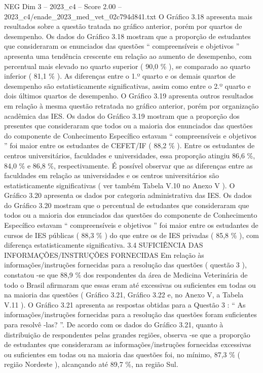 \begin{textsample}{NEG Dim 3 – 2023\_c4 – Score 2.00 – 2023\_c4/enade\_2023\_med\_vet\_02c794d841.txt}
O Gráfico 3.18 apresenta mais resultados sobre a questão tratada no gráfico anterior, porém por quartos de desempenho.
Os dados do Gráfico 3.18 mostram que a proporção de estudantes que consideraram os enunciados das questões “ compreensíveis e objetivos ” apresenta uma tendência crescente em relação ao aumento de desempenho, com percentual mais elevado no quarto superior ( 90,0 \% ), se comparado ao quarto inferior ( 81,1 \% ).
As diferenças entre o 1.º quarto e os demais quartos de desempenho são estatisticamente significativas, assim como entre o 2.º quarto e dois últimos quartos de desempenho.
O Gráfico 3.19 apresenta outros resultados em relação à mesma questão retratada no gráfico anterior, porém por organização acadêmica das IES.
Os dados do Gráfico 3.19 mostram que a proporção dos presentes que consideraram que todos ou a maioria dos enunciados das questões do componente de Conhecimento Específico estavam “ compreensíveis e objetivos ” foi maior entre os estudantes de CEFET/IF ( 88,2 \% ).
Entre os estudantes de centros universitários, faculdades e universidades, essa proporção atingiu 86,6 \%, 84,0 \% e 86,8 \%, respectivamente.
É possível observar que as diferenças entre as faculdades em relação as universidades e os centros universitários são estatisticamente significativas ( ver também Tabela V.10 no Anexo V ).
O Gráfico 3.20 apresenta os dados por categoria administrativa das IES.
Os dados do Gráfico 3.20 mostram que o percentual de estudantes que consideraram que todos ou a maioria dos enunciados das questões do componente de Conhecimento Específico estavam “ compreensíveis e objetivos ” foi maior entre os estudantes de cursos de IES públicas ( 88,3 \% ) do que entre os de IES privadas ( 85,8 \% ), com diferença estatisticamente significativa. 3.4 SUFICIÊNCIA DAS INFORMAÇÕES/INSTRUÇÕES FORNECIDAS Em relação às informações/instruções fornecidas para a resolução das questões ( questão 3 ), constatou -se que 88,9 \% dos respondentes da área de Medicina Veterinária de todo o Brasil afirmaram que essas eram até excessivas ou suficientes em todas ou na maioria das questões ( Gráfico 3.21, Gráfico 3.22 e, no Anexo V, a Tabela V.11 ).
O Gráfico 3.21 apresenta as respostas obtidas para a Questão 3 : “ As informações/instruções fornecidas para a resolução das questões foram suficientes para resolvê -las? ”.
De acordo com os dados do Gráfico 3.21, quanto à distribuição de respondentes pelas grandes regiões, observa -se que a proporção de estudantes que consideraram as informações/instruções fornecidas excessivas ou suficientes em todas ou na maioria das questões foi, no mínimo, 87,3 \% ( região Nordeste ), alcançando até 89,7 \%, na região Sul.

\end{textsample}
